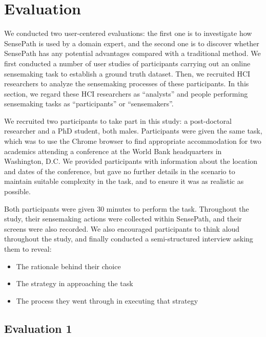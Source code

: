 \section{Evaluation}

We conducted two user-centered evaluations: the first one is to investigate how SensePath is used by a domain expert, and the second one is to discover whether SensePath has any potential advantages compared with a traditional method. We first conducted a number of user studies of participants carrying out an online sensemaking task to establish a ground truth dataset. Then, we recruited HCI researchers to analyze the sensemaking processes of these participants. In this section, we regard these HCI researchers as ``analysts'' and people performing sensemaking tasks as ``participants'' or ``sensemakers''.

We recruited two participants to take part in this study: a post-doctoral researcher and a PhD student, both males. Participants were given the same task, which was to use the Chrome browser to find appropriate accommodation for two academics attending a conference at the World Bank headquarters in Washington, D.C. We provided participants with information about the location and dates of the conference, but gave no further details in the scenario to maintain suitable complexity in the task, and to ensure it was as realistic as possible.

Both participants were given 30 minutes to perform the task. Throughout the study, their sensemaking actions were collected within SensePath, and their screens were also recorded. We also encouraged participants to think aloud throughout the study, and finally conducted a semi-structured interview asking them to reveal:

\begin{itemize}
	\item The rationale behind their choice
	\item The strategy in approaching the task
	\item The process they went through in executing that strategy
\end{itemize}

\subsection{Evaluation 1}

